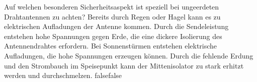     {Auf welchen besonderen Sicherheitsaspekt ist speziell bei ungeerdeten Drahtantennen zu achten?}
    {Bereits durch Regen oder Hagel kann es zu elektrischen Aufladungen der Antenne kommen.}
    {Durch die Sendeleistung entstehen hohe Spannungen gegen Erde, die eine dickere Isolierung des Antennendrahtes erfordern.}
    {Bei Sonnenstürmen entstehen elektrische Aufladungen, die hohe Spannungen erzeugen können.}
    {Durch die fehlende Erdung und den Strombauch im Speisepunkt kann der Mittenisolator zu stark erhitzt werden und durchschmelzen.}
    {false}{false}